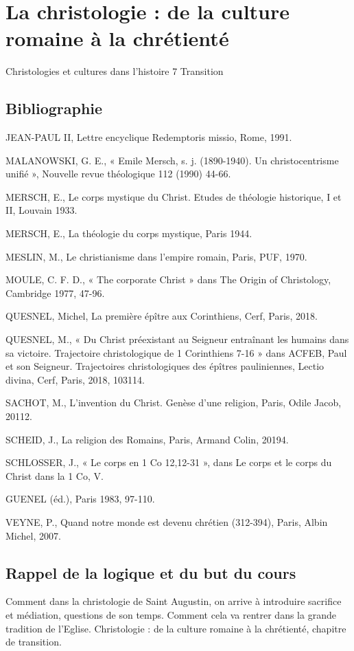 \chapter{La christologie : de la culture romaine à la chrétienté }
Christologies et cultures dans l’histoire 7 Transition
\section{ Bibliographie}

JEAN-PAUL II, Lettre encyclique Redemptoris missio, Rome, 1991. 

MALANOWSKI, G. E., « Emile Mersch, s. j. (1890-1940). Un christocentrisme unifié », Nouvelle revue théologique 112 (1990) 44-66.  

MERSCH, E., Le corps mystique du Christ. Etudes de théologie historique, I et II, Louvain 1933. 

MERSCH, E., La théologie du corps mystique, Paris 1944. 

MESLIN, M., Le christianisme dans l’empire romain, Paris, PUF, 1970. 

MOULE, C. F. D., « The corporate Christ » dans The Origin of Christology, Cambridge 1977, 47-96. 

QUESNEL, Michel, La première épître aux Corinthiens, Cerf, Paris, 2018. 

QUESNEL, M., « Du Christ préexistant au Seigneur entraînant les humains dans sa victoire. Trajectoire christologique de 1 Corinthiens 7-16 » dans ACFEB, Paul et son Seigneur. Trajectoires christologiques des épîtres pauliniennes, Lectio divina, Cerf, Paris, 2018, 103114. 

SACHOT, M., L’invention du Christ. Genèse d’une religion, Paris, Odile Jacob, 20112. 

SCHEID, J., La religion des Romains, Paris, Armand Colin, 20194. 

SCHLOSSER, J., « Le corps en 1 Co 12,12-31 », dans Le corps et le corps du Christ dans la 1 Co, V. 

GUENEL (éd.), Paris 1983, 97-110. 

VEYNE, P., Quand notre monde est devenu chrétien (312-394), Paris, Albin Michel, 2007. 

\section{Rappel de la logique et du but du cours}

Comment dans la christologie de Saint Augustin, on arrive à introduire sacrifice et médiation, questions de son temps. Comment cela va rentrer dans la grande tradition de l'Eglise.
Christologie : de la culture romaine à la chrétienté, chapitre de transition.

